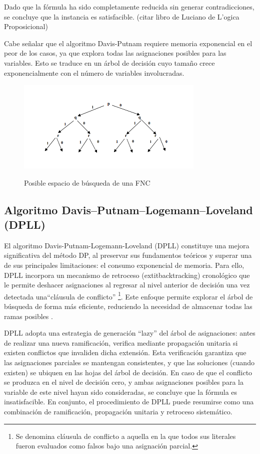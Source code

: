 Dado que la fórmula ha sido completamente reducida sin generar contradicciones, se concluye que la instancia es satisfacible. (citar libro de Luciano de L'ogica Proposicional)

Cabe señalar que el algoritmo Davis-Putnam requiere memoria exponencial en el peor de los casos, ya que explora todas las asignaciones posibles para las variables. Esto se traduce en un árbol de decisión cuyo tamaño crece exponencialmente con el número de variables involucradas.

\begin{figure}[ht]
    \centering
    \includegraphics[width=0.8\textwidth]{Graphics/arboldp.png}
    \caption{Posible espacio de b\'usqueda de una FNC}
    \cite{garcia-satcap}
    \label{fig:arbol DP}
\end{figure}


\subsection{Algoritmo Davis–Putnam–Logemann–Loveland (DPLL)}
\label{subsec:dpll}
El algoritmo Davis-Putnam-Logemann-Loveland (DPLL) constituye una mejora significativa del método DP, al preservar sus fundamentos teóricos y superar una de sus principales limitaciones: el consumo exponencial de memoria. Para ello, DPLL incorpora un mecanismo de retroceso (extit{backtracking}) cronológico que le permite deshacer asignaciones al regresar al nivel anterior de decisión una vez detectada una``cláusula de conflicto'' \footnote{Se denomina cláusula de conflicto a aquella en la que todos sus literales fueron evaluados como falsos bajo una asignación parcial.}. Este enfoque permite explorar el árbol de búsqueda de forma más eficiente, reduciendo la necesidad de almacenar todas las ramas posibles \cite{garcia-satcap}.

DPLL adopta una estrategia de generación ``lazy'' del árbol de asignaciones: antes de realizar una nueva ramificación, verifica mediante propagación unitaria si existen conflictos que invaliden dicha extensión. Esta verificación garantiza que las asignaciones parciales se mantengan consistentes, y que las soluciones (cuando existen) se ubiquen en las hojas del árbol de decisión. En caso de que el conflicto se produzca en el nivel de decisión cero, y ambas asignaciones posibles para la variable de este nivel hayan sido consideradas, se concluye que la fórmula es insatisfacible. En conjunto, el procedimiento de DPLL puede resumirse como una combinación de ramificación, propagación unitaria y retroceso sistemático.

